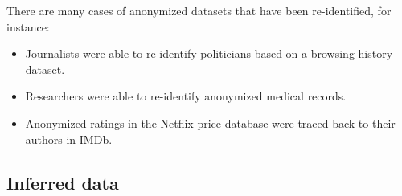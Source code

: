 \begin{example}
    There are many cases of anonymized datasets that have been re-identified, for instance:
    \begin{itemize}
        \item Journalists were able to re-identify politicians based on a browsing history dataset.
        \item Researchers were able to re-identify anonymized medical records.
        \item Anonymized ratings in the Netflix price database were traced back to their authors in IMDb.
    \end{itemize}
\end{example}


\subsection{Inferred data}

